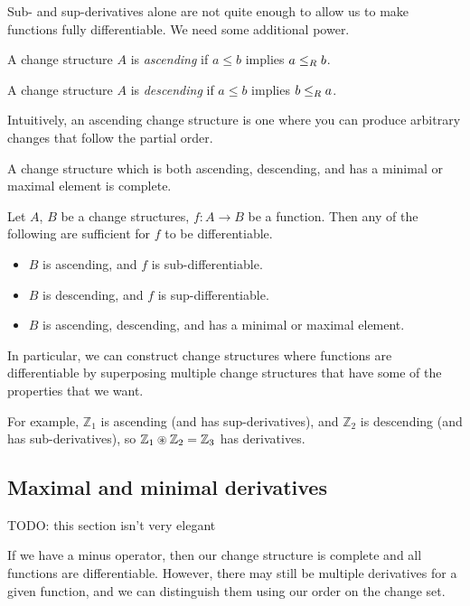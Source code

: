 Sub- and sup-derivatives alone are not quite enough to allow us to make
functions fully differentiable. We need some additional power.

\begin{defn}
  A change structure $A$ is \textit{ascending} if $a \leq b$ implies $a
  \leq_R b$.

  A change structure $A$ is \textit{descending} if $a \leq b$ implies $b
  \leq_R a$.
\end{defn}

Intuitively, an ascending change structure is one where you can produce
arbitrary changes that follow the partial order.

\begin{corollary}
  A change structure which is both ascending, descending, and has a minimal or
  maximal element is complete.
\end{corollary}

\begin{thm}
  Let $A$, $B$ be a change structures, $f: A \rightarrow B$ be a function. Then
  any of the following are sufficient for $f$ to be differentiable.
  \begin{itemize}
    \item $B$ is ascending, and $f$ is sub-differentiable.
    \item $B$ is descending, and $f$ is sup-differentiable.
    \item $B$ is ascending, descending, and has a minimal or maximal element.
  \end{itemize}
\end{thm}

In particular, we can construct change structures where functions are
differentiable by superposing multiple change structures that have some of the
properties that we want.

For example, $\mathbb{Z}_1$ is ascending (and has sup-derivatives), and
$\mathbb{Z}_2$ is descending (and has sub-derivatives), so $\mathbb{Z}_1
\circledast \mathbb{Z}_2 = \mathbb{Z}_3$ has derivatives.

\subsection{Maximal and minimal derivatives}

TODO: this section isn't very elegant

If we have a minus operator, then our change structure is complete and all
functions are differentiable. However, there may still be multiple derivatives
for a given function, and we can distinguish them using our order on the change
set.

